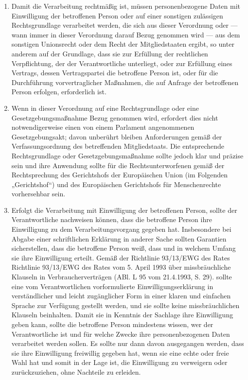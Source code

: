 \begin{enumerate}

   \item Damit die Verarbeitung rechtmäßig ist, müssen personenbezogene Daten mit Einwilligung der betroffenen Person
    oder auf einer sonstigen zulässigen Rechtsgrundlage verarbeitet werden, die sich aus dieser Verordnung oder — wann
    immer in dieser Verordnung darauf Bezug genommen wird — aus dem sonstigen Unionsrecht oder dem Recht der
    Mitgliedstaaten ergibt, so unter anderem auf der Grundlage, dass sie zur Erfüllung der rechtlichen Verpflichtung,
    der der Verantwortliche unterliegt, oder zur Erfüllung eines Vertrags, dessen Vertragspartei die betroffene Person
    ist, oder für die Durchführung vorvertraglicher Maßnahmen, die auf Anfrage der betroffenen Person erfolgen,
    erforderlich ist.%
   \label{eg:40}
   

   \item Wenn in dieser Verordnung auf eine Rechtsgrundlage oder eine Gesetzgebungsmaßnahme Bezug genommen wird,
    erfordert dies nicht notwendigerweise einen von einem Parlament angenommenen Gesetzgebungsakt; davon unberührt
    bleiben Anforderungen gemäß der Verfassungsordnung des betreffenden Mitgliedstaats. Die entsprechende
    Rechtsgrundlage oder Gesetzgebungsmaßnahme sollte jedoch klar und präzise sein und ihre Anwendung sollte für die
    Rechtsunterworfenen gemäß der Rechtsprechung des Gerichtshofs der Europäischen Union (im Folgenden „Gerichtshof“)
    und des Europäischen Gerichtshofs für Menschenrechte vorhersehbar sein.%
   \label{eg:41}
   

   \item Erfolgt die Verarbeitung mit Einwilligung der betroffenen Person, sollte der Verantwortliche nachweisen können,
    dass die betroffene Person ihre Einwilligung zu dem Verarbeitungsvorgang gegeben hat. Insbesondere bei Abgabe einer
    schriftlichen Erklärung in anderer Sache sollten Garantien sicherstellen, dass die betroffene Person weiß, dass und
    in welchem Umfang sie ihre Einwilligung erteilt. Gemäß der Richtlinie 93/13/EWG des Rates\comment
    {Richtlinie 93/13/EWG des Rates vom 5. April 1993 über missbräuchliche Klauseln in Verbraucherverträgen (ABl. L 95
    vom 21.4.1993, S. 29).} sollte eine vom Verantwortlichen vorformulierte Einwilligungserklärung in verständlicher
    und leicht zugänglicher Form in einer klaren und einfachen Sprache zur Verfügung gestellt werden, und sie sollte
    keine missbräuchlichen Klauseln beinhalten. Damit sie in Kenntnis der Sachlage ihre Einwilligung geben kann, sollte
    die betroffene Person mindestens wissen, wer der Verantwortliche ist und für welche Zwecke ihre personenbezogenen
    Daten verarbeitet werden sollen. Es sollte nur dann davon ausgegangen werden, dass sie ihre Einwilligung freiwillig
    gegeben hat, wenn sie eine echte oder freie Wahl hat und somit in der Lage ist, die Einwilligung zu verweigern oder
    zurückzuziehen, ohne Nachteile zu erleiden.%
   \label{eg:42}
   

\end{enumerate}
